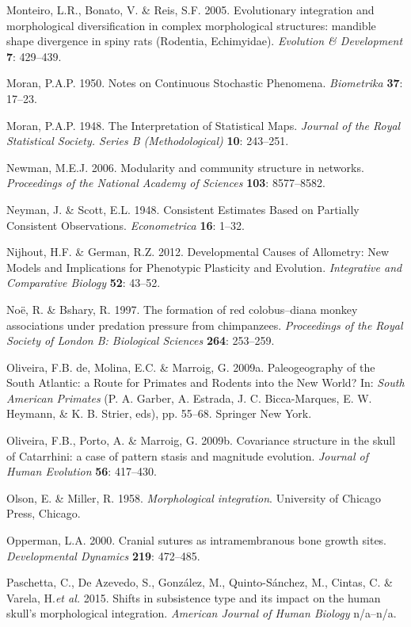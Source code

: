 \documentclass[12pt,twoside]{report}
\begin{document}
Monteiro, L.R., Bonato, V. \& Reis, S.F. 2005. Evolutionary integration
and morphological diversification in complex morphological structures:
mandible shape divergence in spiny rats (Rodentia, Echimyidae).
\emph{Evolution \& Development} \textbf{7}: 429--439.

Moran, P.A.P. 1950. Notes on Continuous Stochastic Phenomena.
\emph{Biometrika} \textbf{37}: 17--23.

Moran, P.A.P. 1948. The Interpretation of Statistical Maps.
\emph{Journal of the Royal Statistical Society. Series B
(Methodological)} \textbf{10}: 243--251.

Newman, M.E.J. 2006. Modularity and community structure in networks.
\emph{Proceedings of the National Academy of Sciences} \textbf{103}:
8577--8582.

Neyman, J. \& Scott, E.L. 1948. Consistent Estimates Based on Partially
Consistent Observations. \emph{Econometrica} \textbf{16}: 1--32.

Nijhout, H.F. \& German, R.Z. 2012. Developmental Causes of Allometry:
New Models and Implications for Phenotypic Plasticity and Evolution.
\emph{Integrative and Comparative Biology} \textbf{52}: 43--52.

Noë, R. \& Bshary, R. 1997. The formation of red colobus--diana monkey
associations under predation pressure from chimpanzees.
\emph{Proceedings of the Royal Society of London B: Biological Sciences}
\textbf{264}: 253--259.

Oliveira, F.B. de, Molina, E.C. \& Marroig, G. 2009a. Paleogeography of
the South Atlantic: a Route for Primates and Rodents into the New World?
In: \emph{South American Primates} (P. A. Garber, A. Estrada, J. C.
Bicca-Marques, E. W. Heymann, \& K. B. Strier, eds), pp. 55--68.
Springer New York.

Oliveira, F.B., Porto, A. \& Marroig, G. 2009b. Covariance structure in
the skull of Catarrhini: a case of pattern stasis and magnitude
evolution. \emph{Journal of Human Evolution} \textbf{56}: 417--430.

Olson, E. \& Miller, R. 1958. \emph{Morphological integration}.
University of Chicago Press, Chicago.

Opperman, L.A. 2000. Cranial sutures as intramembranous bone growth
sites. \emph{Developmental Dynamics} \textbf{219}: 472--485.

Paschetta, C., De Azevedo, S., González, M., Quinto-Sánchez, M., Cintas,
C. \& Varela, H.\emph{et al.} 2015. Shifts in subsistence type and its
impact on the human skull's morphological integration. \emph{American
Journal of Human Biology} n/a--n/a.
\end{document}
